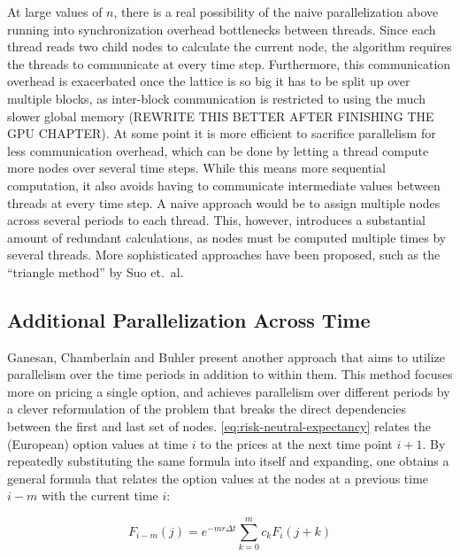 \documentclass[english,12pt,a4paper,pdftex,sci,utf8]{aaltothesis}
\begin{document}
At large values of $n$, there is a real possibility of the naive parallelization above running into synchronization overhead bottlenecks between threads. Since each thread reads two child nodes to calculate the current node, the algorithm requires the threads to communicate at every time step. Furthermore, this communication overhead is exacerbated once the lattice is so big it has to be split up over multiple blocks, as inter-block communication is restricted to using the much slower global memory (REWRITE THIS BETTER AFTER FINISHING THE GPU CHAPTER). At some point it is more efficient to sacrifice parallelism for less communication overhead, which can be done by letting a thread compute more nodes over several time steps. While this means more sequential computation, it also avoids having to communicate intermediate values between threads at every time step. A naive approach would be to assign multiple nodes across several periods to each thread. This, however, introduces a substantial amount of redundant calculations, as nodes must be computed multiple times by several threads. More sophisticated approaches have been proposed, such as the ``triangle method'' by Suo et.\ al.\ \cite{suo2015gpu}

\subsection{Additional Parallelization Across Time}
Ganesan, Chamberlain and Buhler \cite{ganesan2009acceleration} present another approach that aims to utilize parallelism over the time periods in addition to within them. This method focuses more on pricing a single option, and achieves parallelism over different periods by a clever reformulation of the problem that breaks the direct dependencies between the first and last set of nodes. \cref{eq:risk-neutral-expectancy} relates the (European) option values at time $i$ to the prices at the next time point $i+1$. By repeatedly substituting the same formula into itself and expanding, one obtains a general formula that relates the option values at the nodes at a previous time $i-m$ with the current time $i$:

\begin{equation}
    F_{i-m}(j) = e^{-m r \Delta t} \sum_{k=0}^m c_k F_i(j+k)
\label{relative-prices}
\end{equation}
\end{document}
